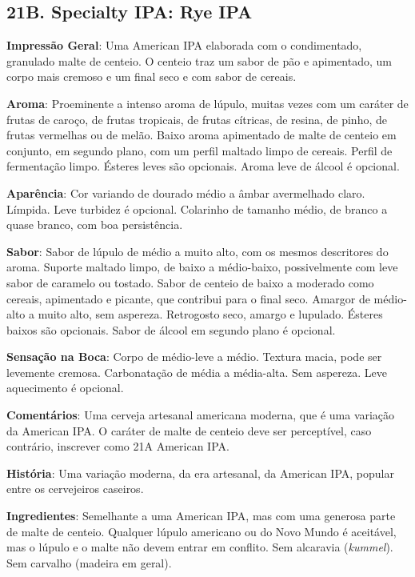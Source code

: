 \subsection*{21B. Specialty IPA: Rye IPA}
\textbf{Impressão Geral}: Uma American IPA elaborada com o condimentado, granulado malte de centeio. O centeio traz um sabor de pão e apimentado, um corpo mais cremoso e um final seco e com sabor de cereais.

\textbf{Aroma}: Proeminente a intenso aroma de lúpulo, muitas vezes com um caráter de frutas de caroço, de frutas tropicais, de frutas cítricas, de resina, de pinho, de frutas vermelhas ou de melão. Baixo aroma apimentado de malte de centeio em conjunto, em segundo plano, com um perfil maltado limpo de cereais. Perfil de fermentação limpo. Ésteres leves são opcionais. Aroma leve de álcool é opcional.

\textbf{Aparência}: Cor variando de dourado médio a âmbar avermelhado claro. Límpida. Leve turbidez é opcional. Colarinho de tamanho médio, de branco a quase branco, com boa persistência.

\textbf{Sabor}: Sabor de lúpulo de médio a muito alto, com os mesmos descritores do aroma. Suporte maltado limpo, de baixo a médio-baixo, possivelmente com leve sabor de caramelo ou tostado. Sabor de centeio de baixo a moderado como cereais, apimentado e picante, que contribui para o final seco. Amargor de médio-alto a muito alto, sem aspereza. Retrogosto seco, amargo e lupulado. Ésteres baixos são opcionais. Sabor de álcool em segundo plano é opcional.

\textbf{Sensação na Boca}: Corpo de médio-leve a médio. Textura macia, pode ser levemente cremosa. Carbonatação de média a média-alta. Sem aspereza. Leve aquecimento é opcional.

\textbf{Comentários}: Uma cerveja artesanal americana moderna, que é uma variação da American IPA. O caráter de malte de centeio deve ser perceptível, caso contrário, inscrever como 21A American IPA.

\textbf{História}: Uma variação moderna, da era artesanal, da American IPA, popular entre os cervejeiros caseiros.

\textbf{Ingredientes}: Semelhante a uma American IPA, mas com uma generosa parte de malte de centeio. Qualquer lúpulo americano ou do Novo Mundo é aceitável, mas o lúpulo e o malte não devem entrar em conflito. Sem alcaravia (\textit{kummel}). Sem carvalho (madeira em geral).

